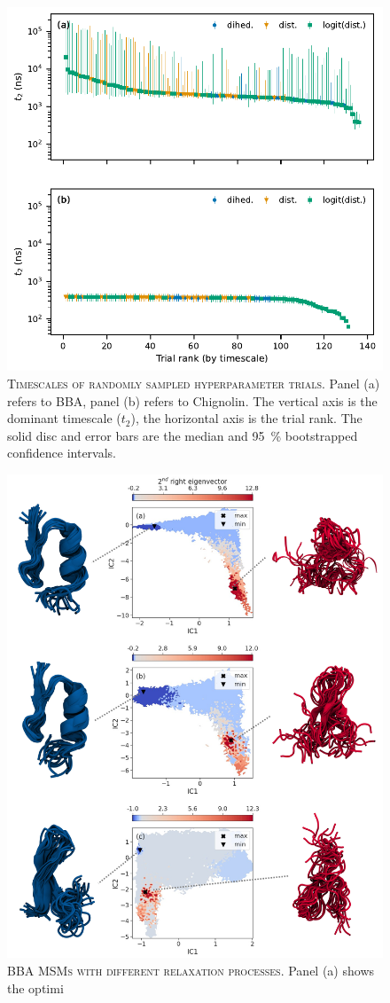 \documentclass[journal=jacsat,manuscript=article]{achemso}
\begin{document}
\begin{figure}
    \centering
    \includegraphics[width=0.7\columnwidth]{results1/timescale_distributions.pdf}
    \caption{\textsc{Timescales of randomly sampled hyperparameter trials.} Panel (a) refers to BBA, panel (b) refers to Chignolin. The vertical axis is the dominant timescale ($t_2$), the horizontal axis is the trial rank. The solid disc and error bars are the median and \SI{95}{\percent} bootstrapped confidence intervals.  }
    \label{fig:random_trials}
\end{figure}


\begin{figure}
    \centering
    \includegraphics[width=0.7\columnwidth]{results1/different_relaxation.png}
    \caption{\textsc{BBA MSMs with different relaxation processes.} Panel (a) shows the optimi}
    \label{fig:bba_differences}
\end{figure}
\end{document}
